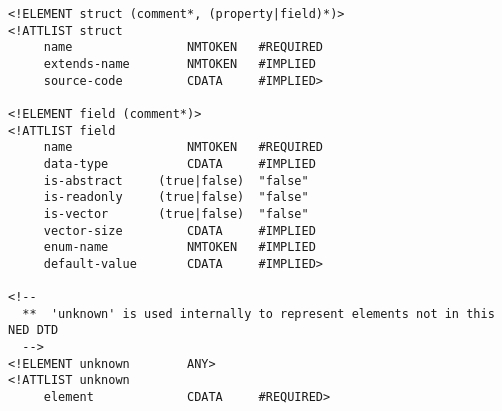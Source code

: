 \begin{verbatim}
<!ELEMENT struct (comment*, (property|field)*)>
<!ATTLIST struct
     name                NMTOKEN   #REQUIRED
     extends-name        NMTOKEN   #IMPLIED
     source-code         CDATA     #IMPLIED>

<!ELEMENT field (comment*)>
<!ATTLIST field
     name                NMTOKEN   #REQUIRED
     data-type           CDATA     #IMPLIED
     is-abstract     (true|false)  "false"
     is-readonly     (true|false)  "false"
     is-vector       (true|false)  "false"
     vector-size         CDATA     #IMPLIED
     enum-name           NMTOKEN   #IMPLIED
     default-value       CDATA     #IMPLIED>

<!--
  **  'unknown' is used internally to represent elements not in this NED DTD
  -->
<!ELEMENT unknown        ANY>
<!ATTLIST unknown
     element             CDATA     #REQUIRED>


\end{verbatim}


